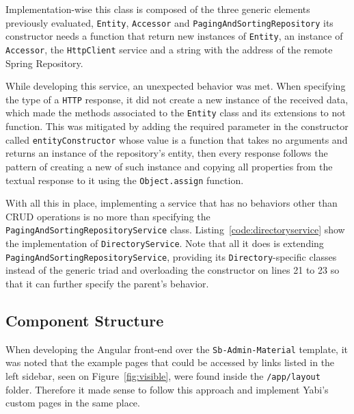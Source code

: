 Implementation-wise this class is composed of the three generic elements previously evaluated, \texttt{Entity}, \texttt{Accessor} and \texttt{PagingAndSortingRepository} its constructor needs a function that return new instances of \texttt{Entity}, an instance of \texttt{Accessor}, the \texttt{HttpClient} service and a string with the address of the remote Spring Repository.

While developing this service, an unexpected behavior was met. When specifying the type of a \texttt{HTTP} response, it did not create a new instance of the received data, which made the methods associated to the \texttt{Entity} class and its extensions to not function. This was mitigated by adding the required parameter in the constructor called \texttt{entityConstructor} whose value is a function that takes no arguments and returns an instance of the repository's entity, then every response follows the pattern of creating a new of such instance and copying all properties from the textual response to it using the \texttt{Object.assign} function.

With all this in place, implementing a service that has no behaviors other than \gls{CRUD} operations is no more than specifying the \texttt{PagingAndSortingRepositoryService} class. Listing~\ref{code:directoryservice} show the implementation of \texttt{DirectoryService}. Note that all it does is extending \texttt{PagingAndSortingRepositoryService}, providing its \texttt{Directory}-specific classes instead of the generic triad and overloading the constructor on lines 21 to 23 so that it can further specify the parent's behavior.



\subsection{Component Structure}\label{component:structure}
When developing the Angular front-end over the \texttt{Sb-Admin-Material} template, it was noted that the example pages that could be accessed by links listed in the left sidebar, seen on Figure~\ref{fig:visible}, were found inside the \texttt{/app/layout} folder. Therefore it made sense to follow this approach and implement \gls{Yabi}'s custom pages in the same place.

